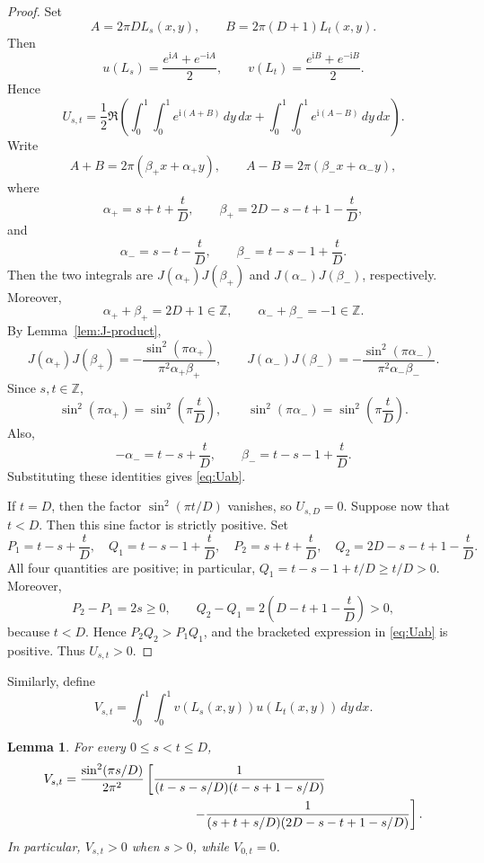 \documentclass[twoside,12pt]{article}
\newcommand{\Z}{\mathbb{Z}}
\newcommand{\1}{\mathbf 1}
\newtheorem{lemma}{Lemma}[section]
\begin{document}
\begin{proof}
Set
\[
A=2\pi D L_s(x,y),
\qquad
B=2\pi(D+1)L_t(x,y).
\]
Then
\[
u(L_s)=\frac{e^{\mathrm iA}+e^{-\mathrm iA}}2,
\qquad
v(L_t)=\frac{e^{\mathrm iB}+e^{-\mathrm iB}}2.
\]
Hence
\[
U_{s,t}
=
\frac12\Re\left(
\int_0^1\!\int_0^1 e^{\mathrm i(A+B)}\,dy\,dx
+
\int_0^1\!\int_0^1 e^{\mathrm i(A-B)}\,dy\,dx
\right).
\]
Write
\[
A+B=2\pi(\beta_+x+\alpha_+y),
\qquad
A-B=2\pi(\beta_-x+\alpha_-y),
\]
where
\[
\alpha_+=s+t+\frac tD,
\qquad
\beta_+=2D-s-t+1-\frac tD,
\]
and
\[
\alpha_-=s-t-\frac tD,
\qquad
\beta_-=t-s-1+\frac tD.
\]
Then the two integrals are \(J(\alpha_+)J(\beta_+)\) and
\(J(\alpha_-)J(\beta_-)\), respectively.  Moreover,
\[
\alpha_++\beta_+=2D+1\in\Z,
\qquad
\alpha_-+\beta_-=-1\in\Z.
\]
By Lemma~\ref{lem:J-product},
\[
J(\alpha_+)J(\beta_+)
=
-\frac{\sin^2(\pi\alpha_+)}{\pi^2\alpha_+\beta_+},
\qquad
J(\alpha_-)J(\beta_-)
=
-\frac{\sin^2(\pi\alpha_-)}{\pi^2\alpha_-\beta_-}.
\]
Since \(s,t\in\Z\),
\[
\sin^2(\pi\alpha_+)=\sin^2\left(\pi\frac tD\right),
\qquad
\sin^2(\pi\alpha_-)=\sin^2\left(\pi\frac tD\right).
\]
Also,
\[
-\alpha_-=t-s+\frac tD,
\qquad
\beta_-=t-s-1+\frac tD.
\]
Substituting these identities gives \eqref{eq:Uab}.

If \(t=D\), then the factor \(\sin^2(\pi t/D)\) vanishes, so
\(U_{s,D}=0\).  Suppose now that \(t<D\).  Then this sine factor is strictly
positive.  Set
\[
P_1=t-s+\frac tD,
\quad
Q_1=t-s-1+\frac tD,
\quad
P_2=s+t+\frac tD,
\quad
Q_2=2D-s-t+1-\frac tD.
\]
All four quantities are positive; in particular,
\(Q_1=t-s-1+t/D\ge t/D>0\).  Moreover,
\[
P_2-P_1=2s\ge0,
\qquad
Q_2-Q_1=2\left(D-t+1-\frac tD\right)>0,
\]
because \(t<D\).  Hence \(P_2Q_2>P_1Q_1\), and the bracketed expression in
\eqref{eq:Uab} is positive.  Thus \(U_{s,t}>0\).
\end{proof}

Similarly, define
\[
V_{s,t}=
\int_0^1\!\int_0^1 v(L_s(x,y))u(L_t(x,y))\,dy\,dx.
\]

\begin{lemma}\label{lem:Vab}
For every \(0\le s<t\le D\),
\begin{align}\label{eq:Vab}
V_{s,t}
&=
\frac{\sin^2(\pi s/D)}{2\pi^2}
\left[
\frac{1}{(t-s-s/D)(t-s+1-s/D)}
\right. \notag\\
&\hspace{3.6cm}\left.
-
\frac{1}{(s+t+s/D)(2D-s-t+1-s/D)}
\right].
\end{align}
In particular, \(V_{s,t}>0\) when \(s>0\), while \(V_{0,t}=0\).
\end{lemma}
\end{document}
